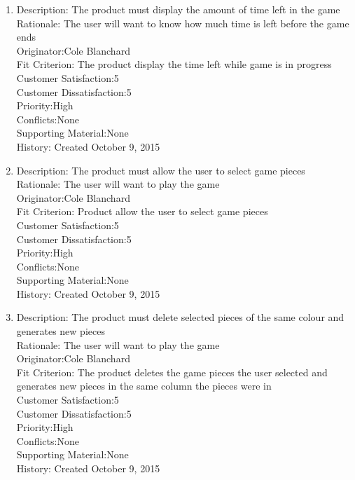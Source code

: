 \documentclass[12pt]{article}
\begin{document}
\begin{enumerate}
 \item Description: The product must display the amount of time left in the game\\
 Rationale: The user will want to know how much time is left before the game ends\\
 Originator:Cole Blanchard\\
 Fit Criterion: The product display the time left while game is in progress\\
 Customer Satisfaction:5\\
 Customer Dissatisfaction:5\\
 Priority:High\\
 Conflicts:None\\
 Supporting Material:None\\
 History: Created October 9, 2015\\
 
 \item Description: The product must allow the user to select game pieces\\
 Rationale: The user will want to play the game\\
 Originator:Cole Blanchard\\
 Fit Criterion: Product allow the user to select game pieces\\
 Customer Satisfaction:5\\
 Customer Dissatisfaction:5\\
 Priority:High\\
 Conflicts:None\\
 Supporting Material:None\\
 History: Created October 9, 2015\\
 
 \item Description: The product must delete selected pieces of the same colour and generates new pieces\\
 Rationale: The user will want to play the game\\
 Originator:Cole Blanchard\\
 Fit Criterion: The product deletes the game pieces the user selected and generates new pieces in the same column the pieces were in\\
 Customer Satisfaction:5\\
 Customer Dissatisfaction:5\\
 Priority:High\\
 Conflicts:None\\
 Supporting Material:None\\
 History: Created October 9, 2015\\
 

\end{enumerate}
\end{document}
